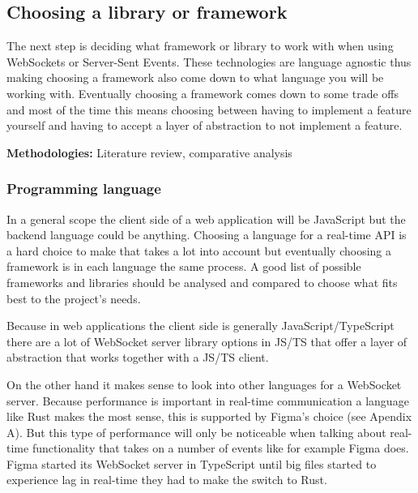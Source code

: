 \newpage


\subsection{Choosing a library or framework}

The next step is deciding what framework or library to work with when using WebSockets or Server-Sent Events. These technologies are language agnostic thus making choosing a framework also come down to what language you will be working with. Eventually choosing a framework comes down to some trade offs and most of the time this means choosing between having to implement a feature yourself and having to accept a layer of abstraction to not implement a feature.

\textbf{Methodologies:} Literature review, comparative analysis

\subsubsection{Programming language}

In a general scope the client side of a web application will be JavaScript but the backend language could be anything. Choosing a language for a real-time API is a hard choice to make that takes a lot into account but eventually choosing a framework is in each language the same process. A good list of possible frameworks and libraries should be analysed and compared to choose what fits best to the project's needs.

Because in web applications the client side is generally JavaScript/TypeScript there are a lot of WebSocket server library options in JS/TS that offer a layer of abstraction that works together with a JS/TS client.

On the other hand it makes sense to look into other languages for a WebSocket server. Because performance is important in real-time communication a language like Rust makes the most sense, this is supported by Figma's choice (see Apendix A). But this type of performance will only be noticeable when talking about real-time functionality that takes on a number of events like for example Figma does. Figma started its WebSocket server in TypeScript until big files started to experience lag in real-time they had to make the switch to Rust.

